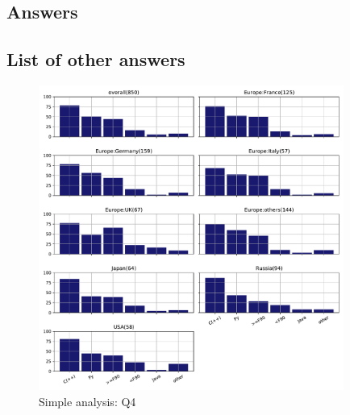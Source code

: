 
\subsection{Answers}


\subsection{List of other answers}
\begin{itemize}

\end{itemize}

\begin{figure}[htb]
\begin{center}
\includegraphics[width=10cm]{../pdfs/Q4.pdf}
\caption{Simple analysis: Q4}
\label{fig:Q4}
\end{center}
\end{figure}
